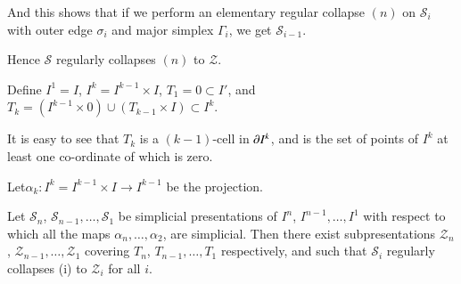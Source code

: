 And this shows that if we perform an elementary regular collapse $(n)$ on $\mathscr{S}_{i}$ with outer edge $\sigma_{i}$ and major simplex $\Gamma_{i}$, we get $\mathscr{S}_{i-1}$.

Hence $\mathscr{S}$ regularly collapses $(n)$ to $\mathscr{Z}$.

Define $I^{1}=I$, $I^{k}=I^{k-1}\times I$, $T_{1}=0\subset I'$, and $T_{k}=(I^{k-1}\times 0)\cup (T_{k-1}\times I)\subset I^{k}$.

It is easy to see that $T_{k}$ is a $(k-1)$-cell in $\partial I^{k}$, and is the set of points of $I^{k}$ at least one co-ordinate of which is zero.

Let\pageoriginale $\alpha_{k}:I^{k}=I^{k-1}\times I\to I^{k-1}$ be the projection. 

\begin{lemma}\label{chap7-lem7.1.3}
Let $\mathscr{S}_{n}$, $\mathscr{S}_{n-1},\ldots,\mathscr{S}_{1}$ be simplicial presentations of $I^{n}$, $I^{n-1},\ldots,I^{1}$ with respect to which all the maps $\alpha_{n},\ldots,\alpha_{2}$, are simplicial. Then there exist subpresentations $\mathscr{Z}_{n}$, $\mathscr{Z}_{n-1},\ldots,\mathscr{Z}_{1}$ covering $T_{n}$, $T_{n-1},\ldots,T_{1}$ respectively, and such that $\mathscr{S}_{i}$ regularly collapses (i) to $\mathscr{Z}_{i}$ for all $i$. 
\end{lemma}

